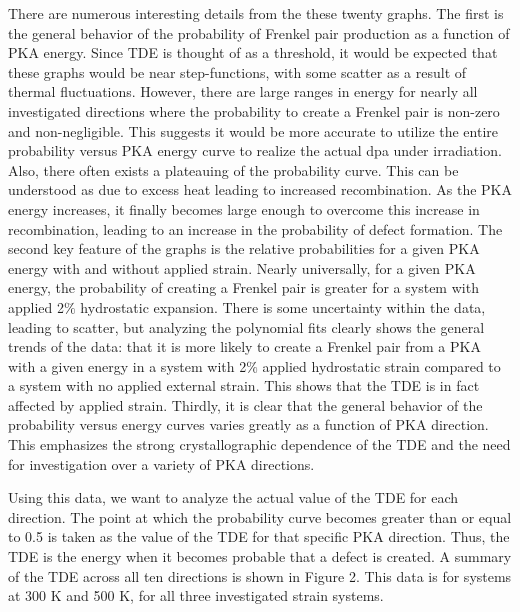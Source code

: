 \documentclass[review]{elsarticle}
\begin{document}
There are numerous interesting details from the these twenty graphs.  The first is the general behavior of the probability of Frenkel pair production as a function of PKA energy.  Since TDE is thought of as a threshold, it would be expected that these graphs would be near step-functions, with some scatter as a result of thermal fluctuations.  However, there are large ranges in energy for nearly all investigated directions where the probability to create a Frenkel pair is non-zero and non-negligible.  This suggests it would be more accurate to utilize the entire probability versus PKA energy curve to realize the actual dpa under irradiation.  Also, there often exists a plateauing of the probability curve.  This can be understood as due to excess heat leading to increased recombination.  As the PKA energy increases, it finally becomes large enough to overcome this increase in recombination, leading to an increase in the probability of defect formation.  The second key feature of the graphs is the relative probabilities for a given PKA energy with and without applied strain.  Nearly universally, for a given PKA energy, the probability of creating a Frenkel pair is greater for a system with applied 2$\%$ hydrostatic expansion.  There is some uncertainty within the data, leading to scatter, but analyzing the polynomial fits clearly shows the general trends of the data: that it is more likely to create a Frenkel pair from a PKA with a given energy in a system with 2$\%$ applied hydrostatic strain compared to a system with no applied external strain.  This shows that the TDE is in fact affected by applied strain.  Thirdly, it is clear that the general behavior of the probability versus energy curves varies greatly as a function of PKA direction.  This emphasizes the strong crystallographic dependence of the TDE and the need for investigation over a variety of PKA directions.

Using this data, we want to analyze the actual value of the TDE for each direction.  The point at which the probability curve becomes greater than or equal to 0.5 is taken as the value of the TDE for that specific PKA direction.  Thus, the TDE is the energy when it becomes probable that a defect is created.  A summary of the TDE across all ten directions is shown in Figure 2.  This data is for systems at 300 K and 500 K, for all three investigated strain systems.  
\end{document}
